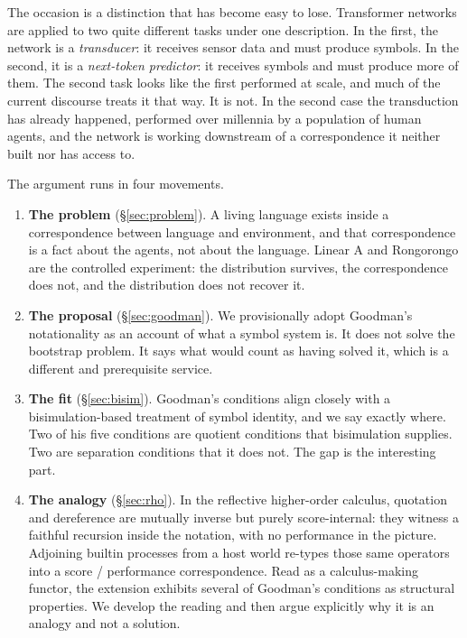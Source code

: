 \documentclass[11pt,a4paper]{article}
\theoremstyle{definition}
\theoremstyle{plain}
\theoremstyle{remark}
\begin{document}
The occasion is a distinction that has become easy to lose. Transformer networks are
applied to two quite different tasks under one description. In the first, the network is
a \emph{transducer}: it receives sensor data and must produce symbols. In the second, it
is a \emph{next-token predictor}: it receives symbols and must produce more of them. The
second task looks like the first performed at scale, and much of the current discourse
treats it that way. It is not. In the second case the transduction has already happened,
performed over millennia by a population of human agents, and the network is working
downstream of a correspondence it neither built nor has access to.

The argument runs in four movements.

\begin{enumerate}[label=(\arabic*),leftmargin=2.2em]
\item \textbf{The problem} (\S\ref{sec:problem}). A living language exists inside a
correspondence between language and environment, and that correspondence is a fact about
the agents, not about the language. Linear A and Rongorongo are the controlled
experiment: the distribution survives, the correspondence does not, and the distribution
does not recover it.
\item \textbf{The proposal} (\S\ref{sec:goodman}). We provisionally adopt Goodman's
notationality as an account of what a symbol system is. It does not solve the bootstrap
problem. It says what would count as having solved it, which is a different and
prerequisite service.
\item \textbf{The fit} (\S\ref{sec:bisim}). Goodman's conditions align closely with a
bisimulation-based treatment of symbol identity, and we say exactly where. Two of his
five conditions are quotient conditions that bisimulation supplies. Two are separation
conditions that it does not. The gap is the interesting part.
\item \textbf{The analogy} (\S\ref{sec:rho}). In the reflective higher-order calculus,
quotation and dereference are mutually inverse but purely score-internal: they witness a
faithful recursion inside the notation, with no performance in the picture. Adjoining
builtin processes from a host world re-types those same operators into a score /
performance correspondence. Read as a calculus-making functor, the extension exhibits
several of Goodman's conditions as structural properties. We develop the reading and
then argue explicitly why it is an analogy and not a solution.
\end{enumerate}
\end{document}
